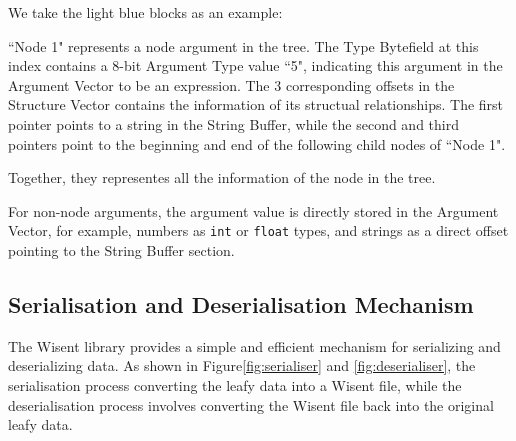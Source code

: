 We take the light blue blocks as an example: 

``Node 1" represents a node argument in the tree. The Type Bytefield at this index contains a 8-bit Argument Type value ``5", indicating this argument in the Argument Vector to be an expression. The 3 corresponding offsets in the Structure Vector contains the information of its structual relationships. The first pointer points to a string in the String Buffer, while the second and third pointers point to the beginning and end of the following child nodes of ``Node 1". 

Together, they representes all the information of the node in the tree. 

For non-node arguments, the argument value is directly stored in the Argument Vector, for example, numbers as \texttt{int} or \texttt{float} types, and strings as a direct offset pointing to the String Buffer section.

\subsection{Serialisation and Deserialisation Mechanism}

The Wisent library provides a simple and efficient mechanism for serializing and deserializing data. As shown in Figure\ref{fig:serialiser} and \ref{fig:deserialiser}, the serialisation process converting the leafy data into a Wisent file, while the deserialisation process involves converting the Wisent file back into the original leafy data.

